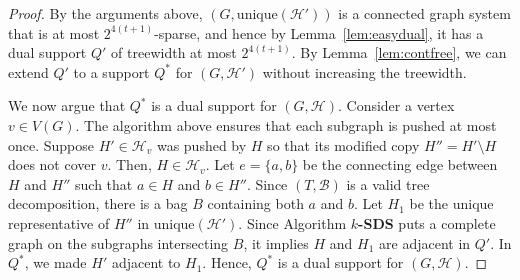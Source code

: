 \documentclass[10pt,a4paper]{amsart}
\newcommand{\HH}{\mathcal{H}}
\newcommand{\unique}{\textrm{unique}}
\begin{document}
\begin{proof}
By the arguments above, $(G,\unique(\mathcal{H}'))$ is a connected
graph system that is at most $2^{4(t+1)}$-sparse, and hence by 
Lemma~\ref{lem:easydual}, it has a dual support $Q'$ of treewidth at most
$2^{4(t+1)}$. By Lemma~\ref{lem:contfree},
we can extend $Q'$ to a support $Q^*$ for $(G,\mathcal{H}')$ without
increasing the treewidth.

We now argue that $Q^*$ is a dual support for
$(G,\mathcal{H})$. Consider a vertex $v\in V(G)$. 
The algorithm above ensures that each subgraph is pushed at most once.
Suppose $H'\in\mathcal{H}_v$ was pushed by $H$ so that its modified copy $H''=H'\setminus H$
does not cover $v$. Then, $H\in\mathcal{H}_v$.
Let $e =\{a,b\}$ be the connecting edge between $H$ and $H''$ such that $a\in H$ and $b\in H''$.
Since $(T,\mathcal{B})$
is a valid tree decomposition, there is a bag $B$ containing both $a$ and $b$.
Let $H_1$ be the unique representative of $H''$ in $\unique(\HH')$.
Since Algorithm {\bf $k$-SDS} puts a complete graph on the subgraphs intersecting
$B$, it implies $H$ and $H_1$ are adjacent in $Q'$.
In $Q^*$, we made $H'$ adjacent to $H_1$.
Hence, $Q^*$ is a dual support for $(G,\HH)$.
\end{proof}
\end{document}
